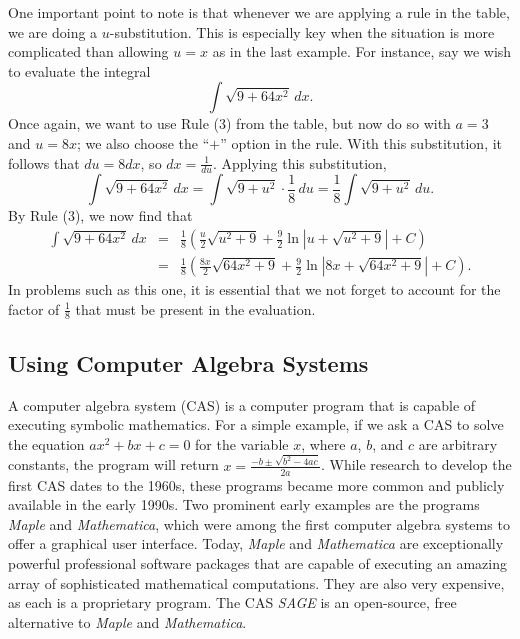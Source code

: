 One important point to note is that whenever we are applying a rule in the table, we are doing a $u$-substitution.  This is especially key when the situation is more complicated than allowing $u = x$ as in the last example.  For instance, say we wish to evaluate the integral
$$\int \sqrt{9 + 64x^2} \, dx.$$
Once again, we want to use Rule (3) from the table, but now do so with $a = 3$ and $u = 8x$; we also choose the ``$+$'' option in the rule.  With this substitution, it follows that $du = 8dx$, so $dx = \frac{1}{du}$.  Applying this substitution, 
$$\int \sqrt{9 + 64x^2} \, dx = \int \sqrt{9 + u^2} \cdot \frac{1}{8} \, du = \frac{1}{8} \int \sqrt{9+u^2} \, du.$$
By Rule (3), we now find that
\begin{eqnarray*}
  \int \sqrt{9 + 64x^2} \, dx & = & \frac{1}{8} \left( \frac{u}{2}\sqrt{u^2 + 9} + \frac{9}{2}\ln|u + \sqrt{u^2 + 9}| + C \right) \\
  				& = & \frac{1}{8} \left( \frac{8x}{2}\sqrt{64x^2 + 9} + \frac{9}{2}\ln|8x + \sqrt{64x^2 + 9}| + C \right).
\end{eqnarray*}
In problems such as this one, it is essential that we not forget to account for the factor of $\frac{1}{8}$ that must be present in the evaluation.



\subsection*{Using Computer Algebra Systems} 

A computer algebra system (CAS) is a computer program that is capable of executing symbolic mathematics.  For a simple example, if we ask a CAS to solve the equation $ax^2 + bx + c = 0$ for the variable $x$, where $a$, $b$, and $c$ are arbitrary constants, the program will return $x = \frac{-b \pm \sqrt{b^2 - 4ac}}{2a}$.  While research to develop the first CAS dates to the 1960s, these programs became more common and publicly available in the early 1990s.  Two prominent early examples are the programs \emph{Maple} and \emph{Mathematica}, which were among the first computer algebra systems to offer a graphical user interface.  Today, \emph{Maple} and \emph{Mathematica} are exceptionally powerful professional software packages that are capable of executing an amazing array of sophisticated mathematical computations.  They are also very expensive, as each is a proprietary program.  The CAS \emph{SAGE} is an open-source, free alternative to \emph{Maple} and \emph{Mathematica}.

